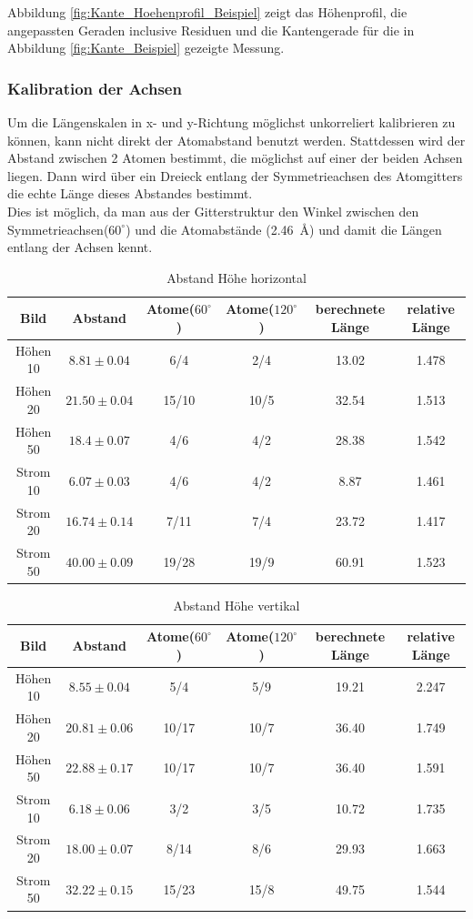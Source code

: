 \documentclass[12pt,a4paper]{article}
\begin{document}
Abbildung \ref{fig:Kante_Hoehenprofil_Beispiel} zeigt das Höhenprofil, die angepassten Geraden inclusive Residuen und die Kantengerade für die in Abbildung \ref{fig:Kante_Beispiel} gezeigte Messung.

\subsubsection{Kalibration der Achsen}
Um die Längenskalen in x- und y-Richtung möglichst unkorreliert kalibrieren zu können, kann nicht direkt der Atomabstand benutzt werden. Stattdessen wird der Abstand zwischen 2 Atomen bestimmt, die möglichst auf einer der beiden Achsen liegen. Dann wird über ein Dreieck entlang der Symmetrieachsen des Atomgitters die echte Länge dieses Abstandes bestimmt.\\
Dies ist möglich, da man aus der Gitterstruktur den Winkel zwischen den Symmetrieachsen($60^{\circ}$) und die Atomabstände (\SI{2.46}{\angstrom}) und damit die Längen entlang der Achsen kennt.

\begin{table}
\begin{tabular}{|c|c||c|c||c|c|}
\hline 
Bild & Abstand & Atome($60^{\circ}$) & Atome($120^{\circ}$) & berechnete Länge & relative Länge\\ 
\hline 
\hline 
Höhen 10 & $8.81\pm 0.04$ & 6/4 & 2/4 & 13.02& 1.478 \\ 
\hline 
Höhen 20 & $21.50\pm 0.04$ & 15/10 & 10/5 & 32.54& 1.513\\ 
\hline 
Höhen 50 & $18.4\pm 0.07$ & 4/6  & 4/2 & 28.38& 1.542\\ 
\hline 
\hline
Strom 10 & $6.07\pm 0.03$ & 4/6 & 4/2 & 8.87& 1.461\\ 
\hline 
Strom 20 & $16.74\pm 0.14$ & 7/11  & 7/4 & 23.72& 1.417\\ 
\hline 
Strom 50 & $40.00\pm 0.09$ & 19/28  & 19/9 & 60.91& 1.523\\ 
\hline 
\end{tabular} 
\caption{Abstand Höhe horizontal}
\label{tab:Atome_horizontal}
\end{table}

\begin{table}
\begin{tabular}{|c|c||c|c||c|c|}
\hline 
Bild & Abstand & Atome($60^{\circ}$) & Atome($120^{\circ}$) & berechnete Länge & relative Länge\\ 
\hline 
\hline 
Höhen 10 & $8.55\pm 0.04$ & 5/4 & 5/9 & 19.21& 2.247\\ 
\hline 
Höhen 20 & $20.81\pm 0.06$ & 10/17  & 10/7 & 36.40& 1.749\\ 
\hline 
Höhen 50 & $22.88\pm 0.17$ & 10/17  & 10/7 & 36.40& 1.591\\ 
\hline 
\hline 
Strom 10 & $6.18\pm 0.06$ & 3/2 & 3/5 & 10.72& 1.735\\ 
\hline 
Strom 20 & $18.00\pm 0.07$ & 8/14  & 8/6 & 29.93& 1.663\\ 
\hline 
Strom 50 & $32.22\pm 0.15$ & 15/23  & 15/8 & 49.75& 1.544\\ 
\hline 
\end{tabular} 
\caption{Abstand Höhe vertikal}
\label{tab:Atome_vertikal}
\end{table}
\end{document}
